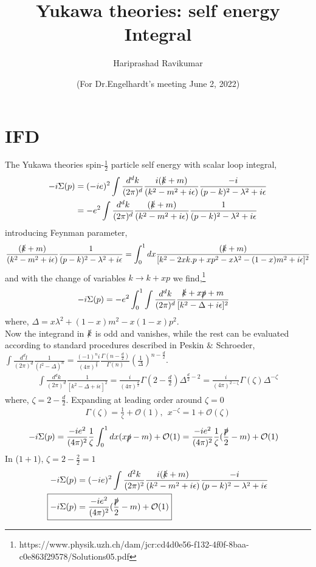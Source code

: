 \documentclass[]{article}
\title{\textbf{Yukawa theories: self energy Integral}}
\author{{Hariprashad Ravikumar}}
\date{(For Dr.Engelhardt's meeting June 2, 2022)}
\numberwithin{equation}{section}
\begin{document}
	\maketitle

\section{IFD}
The Yukawa theories spin-$\frac{1}{2}$ particle self energy with scalar loop integral,
\begin{align}
    -i\Sigma(p)&=(-ie)^2\int \frac{d^dk}{(2\pi)^d}\frac{i(\slashed{k}+m)}{(k^2-m^2+i\epsilon)}\frac{-i}{(p-k)^2-\lambda^2+i\epsilon}\\
    &=-e^2\int \frac{d^dk}{(2\pi)^d}\frac{(\slashed{k}+m)}{(k^2-m^2+i\epsilon)}\frac{1}{(p-k)^2-\lambda^2+i\epsilon}
\end{align}
introducing Feynman parameter,
\begin{align}
\frac{(\slashed{k}+m)}{(k^2-m^2+i\epsilon)}\frac{1}{(p-k)^2-\lambda^2+i\epsilon}=\int_0^1dx\frac{(\slashed{k}+m)}{[k^2-2xk.p+xp^2-x\lambda^2-(1-x)m^2+i\epsilon]^2}
\end{align}
and with the change of variables $k\longrightarrow k+xp$ we find,\footnote{{https://www.physik.uzh.ch/dam/jcr:cd4d0e56-f132-4f0f-8baa-c0e863f29578/Solutions05.pdf}}
\begin{align}
    -i\Sigma(p)&=-e^2\int_0^1\int \frac{d^dk}{(2\pi)^d}\frac{\slashed{k}+x\slashed{p}+m}{[k^2-\Delta+i\epsilon]^2}
\end{align}
where, $\Delta=x\lambda^2+(1-x)m^2-x(1-x)p^2$.\\
Now the integrand in $\slashed{k}$ is odd and vanishes, while the rest can be evaluated according
to standard procedures described in Peskin $\&$ Schroeder, $\int\frac{d^dl}{(2\pi)^d}\frac{1}{(l^2-\Delta)^n}=\frac{(-1)^ni}{(4\pi)^{\frac{d}{2}}}\frac{\Gamma(n-\frac{d}{2})}{\Gamma(n)}\left(\frac{1}{\Delta}\right)^{n-\frac{d}{2}}$.
\begin{align}
    \int \frac{d^dk}{(2\pi)^d}\frac{1}{[k^2-\Delta+i\epsilon]^2}=\frac{i}{(4\pi)^\frac{d}{2}}\Gamma(2-\frac{d}{2})\Delta^{\frac{d}{2}-2}=\frac{i}{(4\pi)^{2-\zeta}}\Gamma(\zeta)\Delta^{-\zeta}
\end{align}
where, $\zeta=2-\frac{d}{2}$. Expanding at leading order around $\zeta=0$
\begin{align}
    \Gamma(\zeta)=\frac{1}{\zeta}+\mathcal{O}(1),~~x^{-\zeta}=1+\mathcal{O}(\zeta)
\end{align}
\begin{align}
    -i\Sigma(p)&=\frac{-ie^2}{(4\pi)^2}\frac{1}{\zeta}\int_0^1dx(x\slashed{p}-m)+\mathcal{O}(1)=\frac{-ie^2}{(4\pi)^2}\frac{1}{\zeta}(\frac{\slashed{p}}{2}-m)+\mathcal{O}(1)
\end{align}
In ($1+1$), $\zeta=2-\frac{2}{2}=1$
\begin{align}
    -i\Sigma(p)&=(-ie)^2\int \frac{d^2k}{(2\pi)^2}\frac{i(\slashed{k}+m)}{(k^2-m^2+i\epsilon)}\frac{-i}{(p-k)^2-\lambda^2+i\epsilon}\\
    \Aboxed{-i\Sigma(p)&=\frac{-ie^2}{(4\pi)^2}(\frac{\slashed{p}}{2}-m)+\mathcal{O}(1)}
\end{align}
\end{document}
